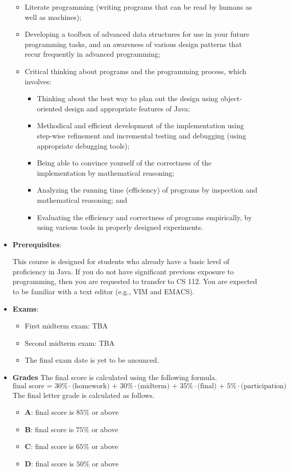 \documentclass[11pt]{article}
\begin{document}
\begin{itemize}
\begin{itemize}
\item
Literate programming (writing programs that can be read by humans as well
as machines);

\item
Developing a toolbox of advanced data structures for use in your future
programming tasks, and an awareness of various design patterns that recur
frequently in advanced programming;

\item
Critical thinking about programs and the programming process, which
involves:
\begin{itemize}
\item
Thinking about the best way to plan out the design using object-oriented
design and appropriate features of Java;
\item
Methodical and efficient development of the implementation using step-wise
refinement and incremental testing and debugging (using appropriate
debugging tools);
\item
Being able to convince yourself of the correctness of the implementation by
mathematical reasoning;
\item
Analyzing the running time (efficiency) of programs by inspection and
mathematical reasoning; and
\item
Evaluating the efficiency and correctness of programs empirically, by using
various tools in properly designed experiments.
\end{itemize}
\end{itemize}

\item {\bf Prerequisites}:

This course is designed for students who already have a basic level of
proficiency in Java. If you do not have significant previous exposure
to programming, then you are requested to transfer to CS 112.  You are
expected to be familiar with a text editor (e.g., VIM and EMACS).

\item {\bf Exams}:
\begin{itemize}
\item
First midterm exam: TBA
\item
Second midterm exam: TBA
\item
The final exam date is yet to be anounced.
\end{itemize}

\item {\bf Grades}
The final score is calculated using the following formula.
\[\mbox{final score = 30\%$\cdot$(homework) + 30\%$\cdot$(midterm) + 35\%$\cdot$(final) + 5\%$\cdot$(participation)}\]
The final letter grade is calculated as follows.
\begin{itemize}
\item{\bf A}: final score is $85\%$ or above
\item{\bf B}: final score is $75\%$ or above
\item{\bf C}: final score is $65\%$ or above
\item{\bf D}: final score is $50\%$ or above
\end{itemize}


\end{itemize}
\end{document}
